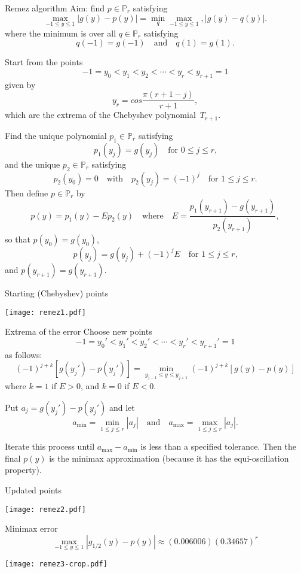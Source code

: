 \begin{frame}{Remez algorithm}
Aim: find $p\in\mathbb{P}_r$ satisfying
\[
\max_{-1\le y\le 1}|g(y)-p(y)|=\min_q\max_{-1\le y\le 1},
    |g(y)-q(y)|.
\]
where the minimum is over all $q\in\mathbb{P}_r$ satisfying
\[
q(-1)=g(-1)\quad\text{and}\quad q(1)=g(1).
\]

Start from the points
\[
-1=y_0<y_1<y_2<\cdots<y_r<y_{r+1}=1
\]
given by
\[
y_r=cos\frac{\pi(r+1-j)}{r+1},
\]
which are the extrema of the Chebyshev polynomial~$T_{r+1}$.
\end{frame}
\begin{frame}
Find the unique polynomial $p_1\in\mathbb{P}_r$ satisfying
\[
p_1(y_j)=g(y_j)\quad\text{for $0\le j\le r$,}
\]
and the unique $p_2\in\mathbb{P}_r$ satisfying
\[
p_2(y_0)=0\quad\text{with}\quad p_2(y_j)=(-1)^j\quad\text{for $1\le j\le r$.}
\]
Then define $p\in\mathbb{P}_r$ by
\[
p(y)=p_1(y)-Ep_2(y)\quad\text{where}\quad 
E=\frac{p_1(y_{r+1})-g(y_{r+1})}{p_2(y_{r+1})},
\]
so that $p(y_0)=g(y_0)$, 
\[
p(y_j)=g(y_j)+(-1)^jE\quad\text{for $1\le j\le r$,}
\]
and $p(y_{r+1})=g(y_{r+1})$.
\end{frame}
\begin{frame}{Starting (Chebyshev) points}
\begin{center}
\texttt{[image: remez1.pdf]}
\end{center}
\end{frame}
\begin{frame}{Extrema of the error}
Choose new points
\[
-1=y_0'<y_1'<y_2'<\cdots<y_r'<y_{r+1}'=1
\]
as follows: 
\[
(-1)^{j+k}[g(y_j')-p(y_j')]=\min_{y_{j-1}\le y\le y_{j+1}}
    (-1)^{j+k}[g(y)-p(y)]
\]
where $k=1$ if $E>0$, and $k=0$ if $E<0$.

Put $a_j=g(y_j')-p(y_j')$ and let
\[
a_{\min}=\min_{1\le j\le r}|a_j|
\quad\text{and}\quad
a_{\max}=\max_{1\le j\le r}|a_j|.
\]

Iterate this process until $a_{\max}-a_{\min}$ is less than a specified 
tolerance.  Then the final $p(y)$ is the minimax approximation (because it has 
the equi-oscillation property).
\end{frame}
\begin{frame}{Updated points}
\begin{center}
\texttt{[image: remez2.pdf]}
\end{center}
\end{frame}
\begin{frame}{Minimax error}
\[
\max_{-1\le y\le 1}|g_{1/2}(y)-p(y)|\approx (0.006006)(0.34657)^r
\]
\begin{center}
\texttt{[image: remez3-crop.pdf]}
\end{center}
\end{frame}
